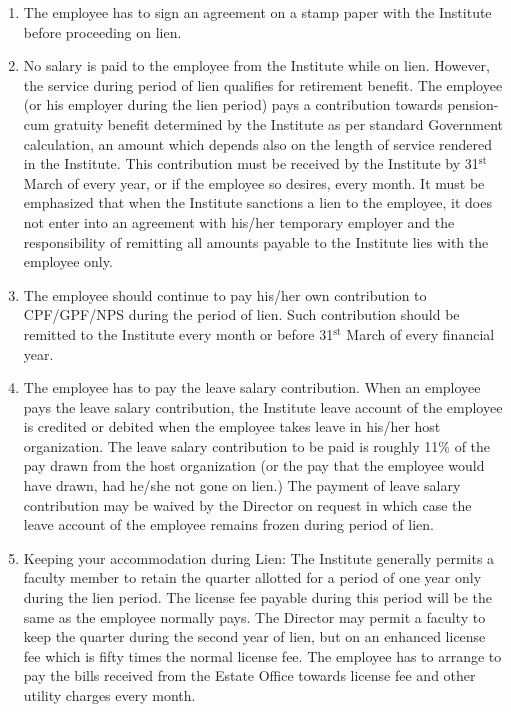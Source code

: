 \documentclass[
  10pt,
  a5paper,
  10pt,
  openany]{amsbook}
\providecommand{\tightlist}{%
  \setlength{\itemsep}{0pt}\setlength{\parskip}{0pt}}
\begin{document}
\begin{enumerate}
\def\labelenumi{\arabic{enumi}.}
\tightlist
\item
  The employee has to sign an agreement on a stamp paper with the
  Institute before proceeding on lien.
\item
  No salary is paid to the employee from the Institute while on lien.
  However, the service during period of lien qualifies for retirement
  benefit. The employee (or his employer during the lien period) pays a
  contribution towards pension-cum gratuity benefit determined by the
  Institute as per standard Government calculation, an amount which
  depends also on the length of service rendered in the Institute. This
  contribution must be received by the Institute by 31\(^{\text{st}}\)
  March of every year, or if the employee so desires, every month. It
  must be emphasized that when the Institute sanctions a lien to the
  employee, it does not enter into an agreement with his/her temporary
  employer and the responsibility of remitting all amounts payable to
  the Institute lies with the employee only.
\item
  The employee should continue to pay his/her own contribution to
  CPF/GPF/NPS during the period of lien. Such contribution should be
  remitted to the Institute every month or before 31\(^{\text{st}}\)
  March of every financial year.
\item
  The employee has to pay the leave salary contribution. When an
  employee pays the leave salary contribution, the Institute leave
  account of the employee is credited or debited when the employee takes
  leave in his/her host organization. The leave salary contribution to
  be paid is roughly 11\% of the pay drawn from the host organization
  (or the pay that the employee would have drawn, had he/she not gone on
  lien.) The payment of leave salary contribution may be waived by the
  Director on request in which case the leave account of the employee
  remains frozen during period of lien.
\item
  Keeping your accommodation during Lien: The Institute generally
  permits a faculty member to retain the quarter allotted for a period
  of one year only during the lien period. The license fee payable
  during this period will be the same as the employee normally pays. The
  Director may permit a faculty to keep the quarter during the second
  year of lien, but on an enhanced license fee which is fifty times the
  normal license fee. The employee has to arrange to pay the bills
  received from the Estate Office towards license fee and other utility
  charges every month.
\end{enumerate}
\end{document}
